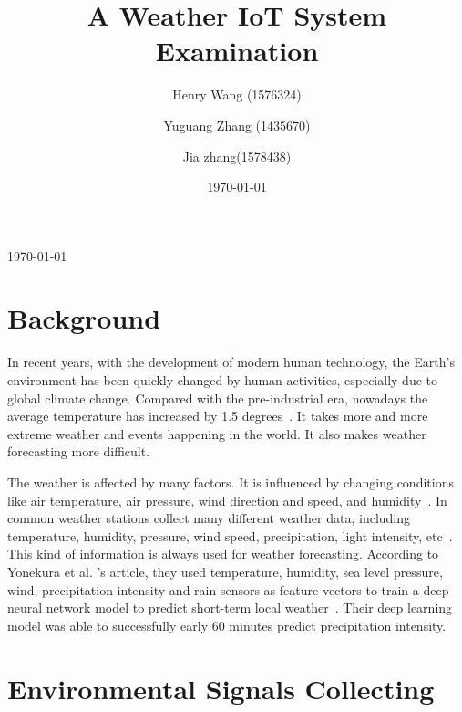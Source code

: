 \documentclass[11pt]{article}
\title{A Weather IoT System Examination}
\author{
    Henry Wang (1576324) \and
    Yuguang Zhang (1435670) \and
    Jia zhang(1578438)
}
\date{\today}
\begin{document}
\begin{titlepage}
  \centering
  \vspace*{\fill}
  {\LARGE \bfseries \thetitle \par}
  \vspace{2cm}
  {\large \theauthor \par}
  \vspace{2cm}
  {\large \today \par}
  \vspace*{\fill}
\end{titlepage}

\clearpage

\tableofcontents
\clearpage

\thispagestyle{fancy}


\section{Background}

In recent years, with the development of modern human technology, the Earth's environment has been quickly changed by human activities, especially due to global climate change. Compared with the pre-industrial era, nowadays the average temperature has increased by 1.5 degrees~\cite{shaw2024automatic}. It takes more and more extreme weather and events happening in the world. It also makes weather forecasting more difficult.

The weather is affected by many factors. It is influenced by changing conditions like air temperature, air pressure, wind direction and speed, and humidity~\cite{varghese2019iot}. In common weather stations collect many different weather data, including temperature, humidity, pressure, wind speed, precipitation, light intensity, etc~\cite{shaw2024automatic}. This kind of information is always used for weather forecasting. According to Yonekura et al. 's article, they used temperature, humidity, sea level pressure, wind, precipitation intensity and rain sensors as feature vectors to train a deep neural network model to predict short-term local weather~\cite{mishra2021study}. Their deep learning model was able to successfully early 60 minutes predict precipitation intensity.


\section{Environmental Signals Collecting}
\end{document}
